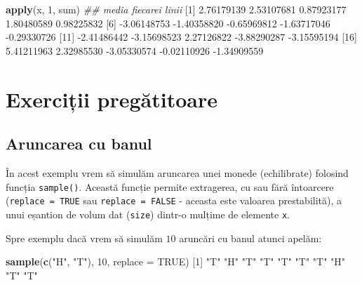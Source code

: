 \documentclass[]{article}
\newenvironment{Shaded}{\begin{snugshade}}{\end{snugshade}}
\newcommand{\CommentTok}[1]{\textcolor[rgb]{0.56,0.35,0.01}{\textit{#1}}}
\newcommand{\DataTypeTok}[1]{\textcolor[rgb]{0.13,0.29,0.53}{#1}}
\newcommand{\DecValTok}[1]{\textcolor[rgb]{0.00,0.00,0.81}{#1}}
\newcommand{\FloatTok}[1]{\textcolor[rgb]{0.00,0.00,0.81}{#1}}
\newcommand{\KeywordTok}[1]{\textcolor[rgb]{0.13,0.29,0.53}{\textbf{#1}}}
\newcommand{\NormalTok}[1]{#1}
\newcommand{\OtherTok}[1]{\textcolor[rgb]{0.56,0.35,0.01}{#1}}
\newcommand{\StringTok}[1]{\textcolor[rgb]{0.31,0.60,0.02}{#1}}
\begin{document}
\begin{Shaded}
\begin{Highlighting}[]
\KeywordTok{apply}\NormalTok{(x, }\DecValTok{1}\NormalTok{, sum)   }\CommentTok{## media fiecarei linii}
\NormalTok{ [}\DecValTok{1}\NormalTok{]  }\FloatTok{2.76179139}  \FloatTok{2.53107681}  \FloatTok{0.87923177}  \FloatTok{1.80480589}  \FloatTok{0.98225832}
\NormalTok{ [}\DecValTok{6}\NormalTok{] }\FloatTok{-3.06148753} \FloatTok{-1.40358820} \FloatTok{-0.65969812} \FloatTok{-1.63717046} \FloatTok{-0.29330726}
\NormalTok{[}\DecValTok{11}\NormalTok{] }\FloatTok{-2.41486442} \FloatTok{-3.15698523}  \FloatTok{2.27126822} \FloatTok{-3.88290287} \FloatTok{-3.15595194}
\NormalTok{[}\DecValTok{16}\NormalTok{]  }\FloatTok{5.41211963}  \FloatTok{2.32985530} \FloatTok{-3.05330574} \FloatTok{-0.02110926} \FloatTok{-1.34909559}
\end{Highlighting}
\end{Shaded}

\hypertarget{exerciux21bii-pregux103titoare}{%
\section{Exerciții pregătitoare}\label{exerciux21bii-pregux103titoare}}

\hypertarget{aruncarea-cu-banul}{%
\subsection{Aruncarea cu banul}\label{aruncarea-cu-banul}}

În acest exemplu vrem să simulăm aruncarea unei monede (echilibrate)
folosind funcția \texttt{sample()}. Această funcție permite extragerea,
cu sau fără întoarcere (\texttt{replace\ =\ TRUE} sau
\texttt{replace\ =\ FALSE} - aceasta este valoarea prestabilită), a unui
eșantion de volum dat (\texttt{size}) dintr-o mulțime de elemente
\texttt{x}.

Spre exemplu dacă vrem să simulăm \(10\) aruncări cu banul atunci
apelăm:

\begin{Shaded}
\begin{Highlighting}[]
\KeywordTok{sample}\NormalTok{(}\KeywordTok{c}\NormalTok{(}\StringTok{"H"}\NormalTok{, }\StringTok{"T"}\NormalTok{), }\DecValTok{10}\NormalTok{, }\DataTypeTok{replace =} \OtherTok{TRUE}\NormalTok{)}
\NormalTok{ [}\DecValTok{1}\NormalTok{] }\StringTok{"T"} \StringTok{"H"} \StringTok{"T"} \StringTok{"T"} \StringTok{"T"} \StringTok{"T"} \StringTok{"T"} \StringTok{"H"} \StringTok{"T"} \StringTok{"T"}
\end{Highlighting}
\end{Shaded}
\end{document}
